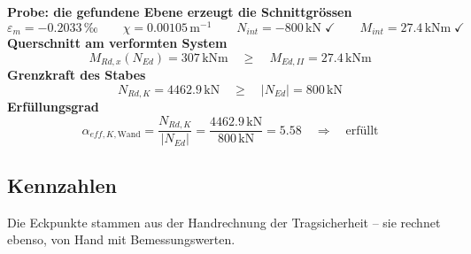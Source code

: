 \documentclass[11pt,a4paper]{article}
\begin{document}
\noindent\textbf{Probe: die gefundene Ebene erzeugt die Schnittgrössen}
\begin{equation*}
\varepsilon_m = -0.2033\,\text{‰} \qquad \chi = 0.00105\,\mathrm{m}^{-1} \qquad N_{int} = -800\,\mathrm{kN} \;\checkmark \qquad M_{int} = 27.4\,\mathrm{kNm} \;\checkmark
\end{equation*}
\noindent\textbf{Querschnitt am verformten System}
\begin{equation*}
M_{Rd,x}(N_{Ed}) = 307\,\mathrm{kNm} \quad \ge \quad M_{Ed,II} = 27.4\,\mathrm{kNm}
\end{equation*}
\noindent\textbf{Grenzkraft des Stabes}
\begin{equation*}
N_{Rd,K} = 4462.9\,\mathrm{kN} \quad \ge \quad \left|N_{Ed}\right| = 800\,\mathrm{kN}
\end{equation*}
\noindent\textbf{Erfüllungsgrad}
\begin{equation*}
\alpha_{eff,K,\text{Wand}} = \frac{N_{Rd,K}}{\left|N_{Ed}\right|} = \frac{4462.9\,\mathrm{kN}}{800\,\mathrm{kN}} = 5.58 \quad \Rightarrow \quad \text{erfüllt}
\end{equation*}
\subsection{Kennzahlen}
Die Eckpunkte stammen aus der Handrechnung der Tragsicherheit – sie rechnet ebenso, von Hand mit Bemessungswerten.
\end{document}
